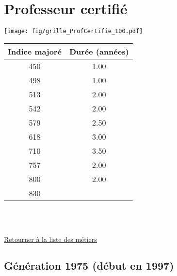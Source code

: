 \newpage 
 
\chapter{Professeur certifié} 

\begin{minipage}{0.55\linewidth}\texttt{[image: fig/grille\_ProfCertifie\_100.pdf]}\end{minipage} 
\begin{minipage}{0.3\linewidth} 
 \begin{center} 

\begin{tabular}[htb]{|c|c|} 
\hline 
 Indice majoré &  Durée (années) \\ 
\hline \hline 
 450 &  1.00 \\ 
\hline 
 498 &  1.00 \\ 
\hline 
 513 &  2.00 \\ 
\hline 
 542 &  2.00 \\ 
\hline 
 579 &  2.50 \\ 
\hline 
 618 &  3.00 \\ 
\hline 
 710 &  3.50 \\ 
\hline 
 757 &  2.00 \\ 
\hline 
 800 &  2.00 \\ 
\hline 
 830 &   \\ 
\hline 
\hline 
\end{tabular} 
\end{center} 
 \end{minipage} 

~\\ 
 


   
 \localtableofcontents 

~\\ 
 
 \hyperlink{page.2}{\noindent Retourner à la liste des métiers}

 \newpage 

\section{Génération 1975 (début en 1997)\label{ProfCertifie_100_1975_22_0}} 
 
